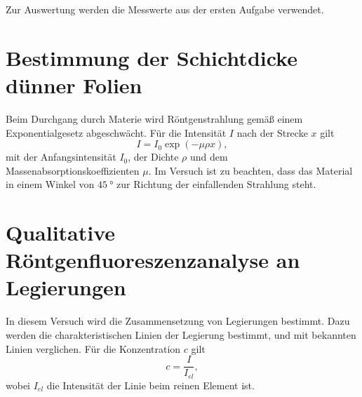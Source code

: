Zur Auswertung werden die Messwerte aus der ersten Aufgabe verwendet.

\section{Bestimmung der Schichtdicke dünner Folien}

Beim Durchgang durch Materie wird Röntgenstrahlung gemäß einem Exponentialgesetz abgeschwächt. Für die Intensität $I$ nach der Strecke $x$ gilt
\begin{equation}
 I = I_{0}\exp(-\mu\rho x),
\end{equation}
mit der Anfangsintensität $I_{0}$, der Dichte $\rho$ und dem Massenabsorptionskoeffizienten $\mu$. Im Versuch ist zu beachten, dass das Material in einem Winkel von $\SI{45}{\degree}$ zur Richtung der einfallenden Strahlung steht.

\section{Qualitative Röntgenfluoreszenzanalyse an Legierungen}

In diesem Versuch wird die Zusammensetzung von Legierungen bestimmt. Dazu werden die charakteristischen Linien der Legierung bestimmt, und mit bekannten Linien verglichen. Für die Konzentration $c$ gilt
\begin{equation}
 c = \frac{I}{I_{el}},
\end{equation}
wobei $I_{el}$ die Intensität der Linie beim reinen Element ist.



